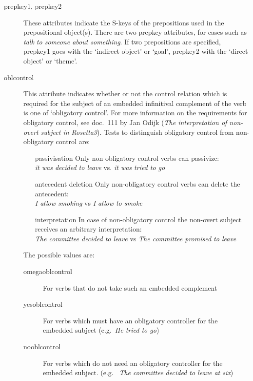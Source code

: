 \begin{description}
\item[prepkey1, prepkey2] These attributes indicate the S-keys of the 
prepositions used in the prepositional object(s). 
There are two prepkey attributes, for cases such as 
{\em talk to someone about something\/}. If two prepositions are specified, 
prepkey1 goes with the `indirect object' or `goal', prepkey2 with the 
`direct object' or `theme'.

\item[oblcontrol] This attribute indicates whether or not the 
control relation which is required for the subject of an embedded infinitival 
complement of the verb is one of `obligatory control'. For more information on 
the requirements for obligatory control, see doc.\ 111 by Jan Odijk ({\em The 
interpretation of non-overt subject in Rosetta3\/}). Tests to distinguish 
obligatory control from non-obligatory control are:
\begin{itemize}
  \item [passivisation] Only non-obligatory control verbs can passivize:\\
 {\em it was decided to leave} vs. {\em it was tried to go}
  \item [antecedent deletion] Only non-obligatory control verbs can delete the 
antecedent:\\
{\em I allow smoking} vs {\em I allow to smoke}      
  \item [interpretation] In case of non-obligatory control the non-overt 
subject receives an arbitrary interpretation:\\
{\em The committee decided to leave} vs {\em The committee promised to leave}
\end{itemize}
The possible values are:
   \begin{description}
   \item[omegaoblcontrol] For verbs that do not take such an embedded 
complement
   \item[yesoblcontrol] For verbs which must have an obligatory controller for 
the embedded subject (e.g.\ {\em He tried to go\/})
   \item[nooblcontrol] For verbs which do not need an obligatory controller for 
the embedded subject. (e.g. \ {\em The committee decided to leave at six\/})
   \end{description}
  

\end{description}
